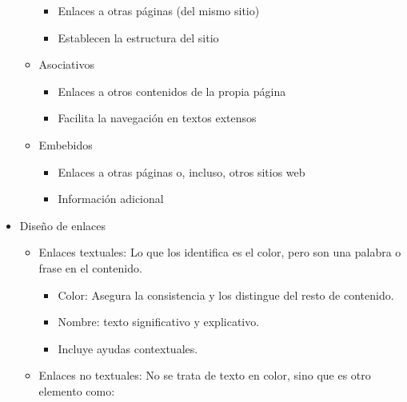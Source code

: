 \documentclass[12pt, twoside, openright]{report} %
\begin{document}
\begin{itemize}
\begin{itemize}
\begin{itemize}
            \item
              Enlaces a otras páginas (del mismo sitio)
            \item
              Establecen la estructura del sitio
          \end{itemize}
        \item
          Asociativos

          \begin{itemize}
          
            \item
              Enlaces a otros contenidos de la propia página
            \item
              Facilita la navegación en textos extensos
          \end{itemize}
        \item
          Embebidos

          \begin{itemize}
          
            \item
              Enlaces a otras páginas o, incluso, otros sitios web
            \item
              Información adicional
          \end{itemize}
      \end{itemize}
    \item Diseño de enlaces

      \begin{itemize}
      
        \item
          Enlaces textuales: Lo que los identifica es el color, pero son
          una palabra o frase en el contenido.

          \begin{itemize}
          
            \item
              Color: Asegura la consistencia y los distingue del resto de
              contenido.
            \item
              Nombre: texto significativo y explicativo.
            \item
              Incluye ayudas contextuales.
          \end{itemize}
        \item
          Enlaces no textuales: No se trata de texto en color, sino que
          es otro elemento como:

          \begin{itemize}
          

\end{itemize}
\end{itemize}
\end{itemize}
\end{document}
